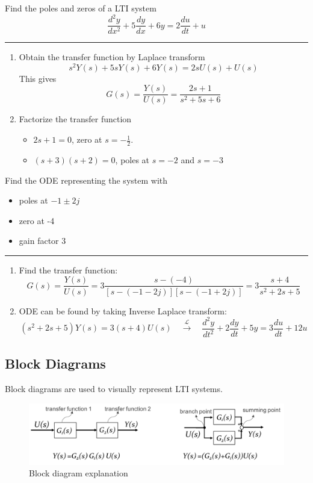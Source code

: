 \begin{ex}{}
Find the poles and zeros of a LTI system
    \[\frac{d^{2}y}{dx^{2}}+5\frac{dy}{dx}+6y = 2\frac{du}{dt}+u\]
\hrule
\vspace{.3cm}
\begin{enumerate}
    \item Obtain the transfer function by Laplace transform
        \[s^{2}Y(s)+5sY(s)+6Y(s) = 2sU(s)+U(s)\]
        This gives
        \[G(s) =\frac{Y(s)}{U(s)} = \frac{2s+1}{s^{2}+5s+6}\]
        
    \item Factorize the transfer function
        \begin{itemize}
            \item $2s+1=0$, zero at $s = -\frac{1}{2}$.
            \item $(s+3)(s+2)=0$, poles at $s = -2$ and $s = -3$
        \end{itemize}
\end{enumerate}
\end{ex}
\begin{ex}{}
Find the ODE representing the system with 
\begin{itemize}
    \item poles at $-1\pm 2j$
    \item zero at -4 
    \item gain factor 3
\end{itemize}
\hrule
\vspace{.3cm}
\begin{enumerate}
    \item Find the transfer function:
    \[
    G(s) = \frac{Y(s)}{U(s)} 
    = 3\frac{s-(-4)}{[s-(-1-2j)][s-(-1+2j)]} 
    = 3\frac{s+4}{s^{2}+2s+5}
    \]
    
    \item ODE can be found by taking Inverse Laplace transform:
    \[
    (s^{2}+2s+5)Y(s) = 3(s+4)U(s)
    \quad \xrightarrow{\mathcal{L}} \quad
    \frac{d^{2}y}{dt^{2}}+2\frac{dy}{dt}+5y 
    = 3\frac{du}{dt}+12u 
    \]
\end{enumerate}
\end{ex}


\subsection{Block Diagrams}
Block diagrams are used to visually represent LTI systems.
\begin{figure}[H] \centering
\includegraphics[width=.9\textwidth]{images/block_diagram.pdf}
\caption{Block diagram explanation}
\end{figure}


